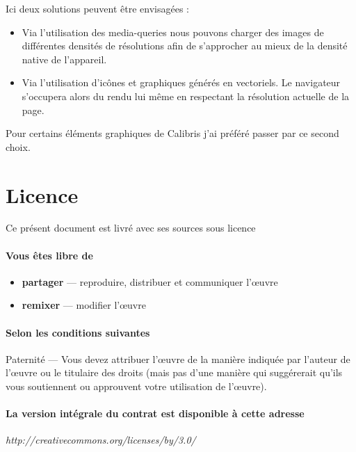 \documentclass[12pt,a4paper]{book}
\begin{document}
Ici deux solutions peuvent être envisagées :
\begin{itemize}
  \item Via l'utilisation des media-queries nous pouvons charger des images de différentes densités de résolutions afin de s'approcher au mieux de la densité native de l'appareil. 
  \item Via l'utilisation d'icônes et graphiques générés en vectoriels. Le navigateur s'occupera alors du rendu lui même en respectant la résolution actuelle de la page.
\end{itemize}

Pour certains éléments graphiques de Calibris j'ai préféré passer par ce second choix.

\listoffigures

\printglossaries

\newpage
{}
\section*{Licence}
\begin{center}
Ce présent document est livré avec ses sources sous licence\\
\end{center}

\paragraph*{Vous êtes libre de}

\begin{itemize}
\item \textbf{partager} — reproduire, distribuer et communiquer l'\oe uvre
\item \textbf{remixer} — modifier l'\oe uvre
\end{itemize}

\paragraph*{Selon les conditions suivantes}
Paternité — Vous devez attribuer l'\oe uvre de la manière indiquée par l'auteur de l'\oe uvre ou le titulaire des droits (mais pas d'une manière qui suggérerait qu'ils vous soutiennent ou approuvent votre utilisation de l'\oe uvre). 

\paragraph*{La version intégrale du contrat est disponible à cette adresse}

\begin{center}
\textit{http://creativecommons.org/licenses/by/3.0/}
\end{center}
\end{document}

